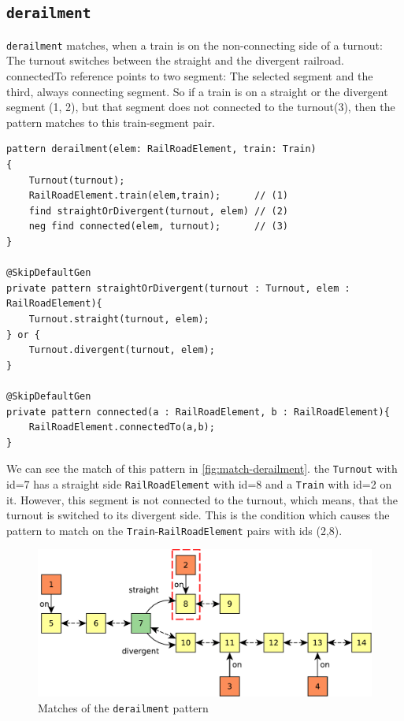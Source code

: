 \subsection{\texttt{derailment}}
\begin{minipage}{\textwidth}
	
\texttt{derailment} matches, when a train is on the non-connecting side of a turnout:
The turnout switches between the straight and the divergent railroad. 
connectedTo reference points to two segment: The selected segment and the third, always connecting segment.
So if a train is on a straight or the divergent segment (1, 2), but that segment does not connected to the turnout(3), then the pattern matches to this train-segment pair.


\begin{lstlisting}[language = vql]
pattern derailment(elem: RailRoadElement, train: Train)
{
	Turnout(turnout);
	RailRoadElement.train(elem,train); 		// (1)
	find straightOrDivergent(turnout, elem) // (2)
	neg find connected(elem, turnout); 		// (3)
}

@SkipDefaultGen
private pattern straightOrDivergent(turnout : Turnout, elem : RailRoadElement){
	Turnout.straight(turnout, elem);
} or {
	Turnout.divergent(turnout, elem);
}

@SkipDefaultGen
private pattern connected(a : RailRoadElement, b : RailRoadElement){
	RailRoadElement.connectedTo(a,b);
}

\end{lstlisting}
\end{minipage}

We can see the match of this pattern in \autoref{fig:match-derailment}. 
the \texttt{Turnout} with id=7 has a straight side \texttt{RailRoadElement} with id=8 and a \texttt{Train} with id=2 on it. However, this segment is not connected to the turnout, which means, that the turnout is switched to its divergent side.
This is the condition which causes the pattern to match on the \texttt{Train}-\texttt{RailRoadElement} pairs with ids (2,8).

\begin{figure}[H]
	\begin{center}
		\includegraphics[width=\textwidth]{figures/query-example-model-derailment.pdf}
	\end{center}
	\caption{Matches of the \texttt{derailment} pattern}
	\label{fig:match-derailment}
\end{figure}



